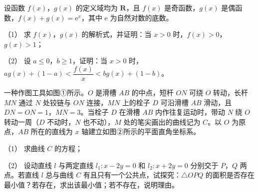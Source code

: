 \begin{question}
设函数 \(f(x)\)，\(g(x)\) 的定义域均为 \(\mathbf{R}\)，且 \(f(x)\) 是奇函数，\(g(x)\) 是偶函数，\(f(x)+g(x)=\mathrm{e}^x\)，其中 \(\mathrm{e}\) 为自然对数的底数。

（1） 求 \(f(x)\)，\(g(x)\) 的解析式，并证明：当 \(x>0\) 时，\(f(x)>0\)，\(g(x)>1\)；

（2） 设 \(a\leqslant0\)，\(b\geqslant1\)，证明：当 \(x>0\) 时，\(ag(x)+(1-a)<\dfrac{f(x)}{x}<bg(x)+(1-b)\)。

\Needspace{0.4\textheight}
\end{question}
\begin{question}
一种作图工具如图①所示。\(O\) 是滑槽 \(AB\) 的中点，短杆 \(ON\) 可绕 \(O\) 转动，长杆 \(MN\) 通过 \(N\) 处铰链与 \(ON\) 连接，\(MN\) 上的栓子 \(D\) 可沿滑槽 \(AB\) 滑动，且 \(DN=ON=1\)，\(MN=3\)。当栓子 \(D\) 在滑槽 \(AB\) 内作往复运动时，带动 \(N\) 绕 \(O\) 转动一周（\(D\) 不动时，\(N\) 也不动），\(M\) 处的笔尖画出的曲线记为 \(C\)。以 \(O\) 为原点，\(AB\) 所在的直线为 \(x\) 轴建立如图②所示的平面直角坐标系。

（1） 求曲线 \(C\) 的方程；

（2） 设动直线 \(l\) 与两定直线 \(l_1:x-2y=0\) 和 \(l_2:x+2y=0\) 分别交于 \(P\)，\(Q\) 两点。若直线 \(l\) 总与曲线 \(C\) 有且只有一个公共点，试探究：\(\triangle OPQ\) 的面积是否存在最小值？若存在，求出该最小值；若不存在，说明理由。
\nopagebreak[4]
\begin{center}\end{center}
\nopagebreak[4]

\end{question}